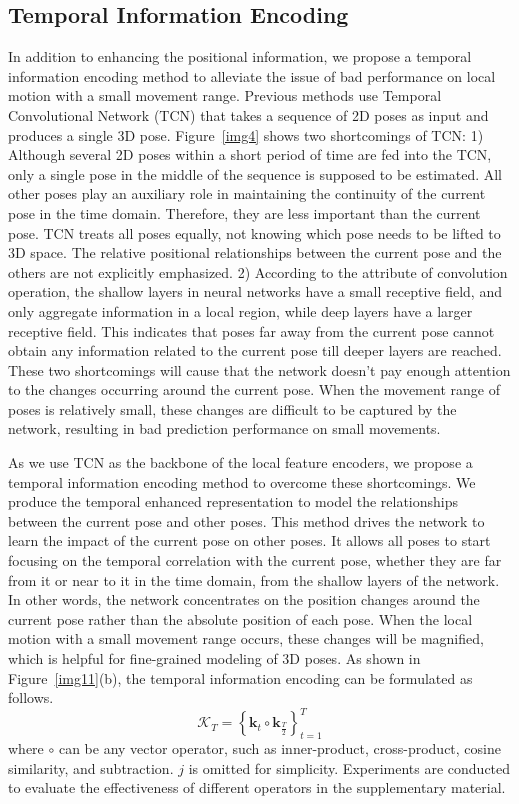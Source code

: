 \documentclass[sigconf]{acmart}
\begin{document}
\subsection{Temporal Information Encoding}\label{T-ENH}
In addition to enhancing the positional information, we propose a temporal information encoding method to alleviate the issue of bad performance on local motion with a small movement range. Previous methods \cite{jllo20193d,liu2020attention} use Temporal Convolutional Network (TCN) that takes a sequence of 2D poses as input and produces a single 3D pose. Figure~\ref{img4} shows two shortcomings of TCN: 1) Although several 2D poses within a short period of time are fed into the TCN, only a single pose in the middle of the sequence is supposed to be estimated. All other poses play an auxiliary role in maintaining the continuity of the current pose in the time domain. Therefore, they are less important than the current pose. TCN treats all poses equally, not knowing which pose needs to be lifted to 3D space. The relative positional relationships between the current pose and the others are not explicitly emphasized. 2) According to the attribute of convolution operation, the shallow layers in neural networks have a small receptive field, and only aggregate information in a local region, while deep layers have a larger receptive field. This indicates that poses far away from the current pose cannot obtain any information related to the current pose till deeper layers are reached. These two shortcomings will cause that the network doesn’t pay enough attention to the changes occurring around the current pose. When the movement range of poses is relatively small, these changes are difficult to be captured by the network, resulting in bad prediction performance on small movements.

As we use TCN as the backbone of the local feature encoders, we propose a temporal information encoding method to overcome these shortcomings. We produce the temporal enhanced representation to model the relationships between the current pose and other poses. This method drives the network to learn the impact of the current pose on other poses. It allows all poses to start focusing on the temporal correlation with the current pose, whether they are far from it or near to it in the time domain, from the shallow layers of the network. In other words, the network concentrates on the position changes around the current pose rather than the absolute position of each pose. When the local motion with a small movement range occurs, these changes will be magnified, which is helpful for fine-grained modeling of 3D poses. As shown in Figure~\ref{img11}(b), the temporal information encoding can be formulated as follows. 
\begin{equation}
\mathcal{K}_{T}=\left\{{\mathbf{k}}_{t}\circ{\mathbf{k}}_{\frac{T}{2}}\right\}_{t=1}^{T}
\end{equation}
where $\circ$ can be any vector operator, such as inner-product, cross-product, cosine similarity, and subtraction. $j$ is omitted for simplicity. Experiments are conducted to evaluate the effectiveness of different operators in the supplementary material.
\end{document}
